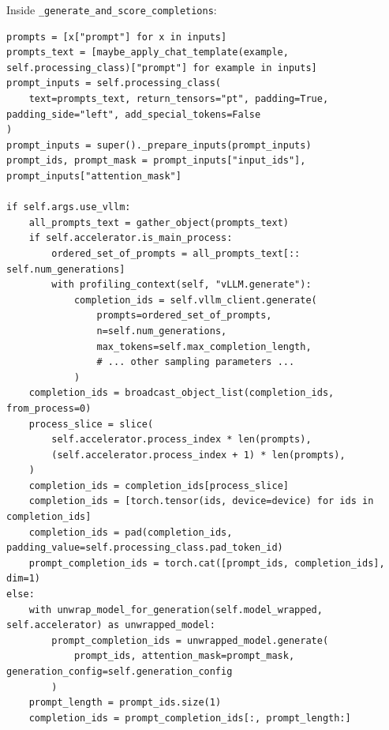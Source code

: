 \documentclass{article}
\begin{document}
Inside \texttt{\_generate\_and\_score\_completions}:

\begin{verbatim}
prompts = [x["prompt"] for x in inputs]
prompts_text = [maybe_apply_chat_template(example, self.processing_class)["prompt"] for example in inputs]
prompt_inputs = self.processing_class(
    text=prompts_text, return_tensors="pt", padding=True, padding_side="left", add_special_tokens=False
)
prompt_inputs = super()._prepare_inputs(prompt_inputs)
prompt_ids, prompt_mask = prompt_inputs["input_ids"], prompt_inputs["attention_mask"]

if self.args.use_vllm:
    all_prompts_text = gather_object(prompts_text)
    if self.accelerator.is_main_process:
        ordered_set_of_prompts = all_prompts_text[:: self.num_generations]
        with profiling_context(self, "vLLM.generate"):
            completion_ids = self.vllm_client.generate(
                prompts=ordered_set_of_prompts,
                n=self.num_generations,
                max_tokens=self.max_completion_length,
                # ... other sampling parameters ...
            )
    completion_ids = broadcast_object_list(completion_ids, from_process=0)
    process_slice = slice(
        self.accelerator.process_index * len(prompts),
        (self.accelerator.process_index + 1) * len(prompts),
    )
    completion_ids = completion_ids[process_slice]
    completion_ids = [torch.tensor(ids, device=device) for ids in completion_ids]
    completion_ids = pad(completion_ids, padding_value=self.processing_class.pad_token_id)
    prompt_completion_ids = torch.cat([prompt_ids, completion_ids], dim=1)
else:
    with unwrap_model_for_generation(self.model_wrapped, self.accelerator) as unwrapped_model:
        prompt_completion_ids = unwrapped_model.generate(
            prompt_ids, attention_mask=prompt_mask, generation_config=self.generation_config
        )
    prompt_length = prompt_ids.size(1)
    completion_ids = prompt_completion_ids[:, prompt_length:]
\end{verbatim}
\end{document}
